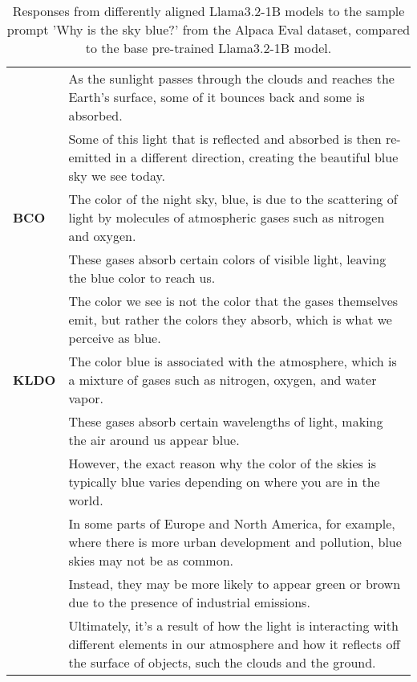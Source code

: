 \begin{table}[!ht]
{\begin{tabular}{ll}
        & \small As the sunlight passes through the clouds and reaches the Earth's surface, some of it bounces back and some is absorbed. \\
        & \small Some of this light that is reflected and absorbed is then re-emitted in a different direction, creating the beautiful blue sky we see today. \\
        \midrule 
        \textbf{BCO} & \small The color of the night sky, blue, is due to the scattering of light by molecules of atmospheric gases such as nitrogen and oxygen. \\
        & \small These gases absorb certain colors of visible light, leaving the blue color to reach us. \\
        & \small The color we see is not the color that the gases themselves emit, but rather the colors they absorb, which is what we perceive as blue. \\
        \midrule
        \textbf{KLDO} & \small The color blue is associated with the atmosphere, which is a mixture of gases such as nitrogen, oxygen, and water vapor. \\
        & \small These gases absorb certain wavelengths of light, making the air around us appear blue. \\
        & \small However, the exact reason why the color of the skies is typically blue varies depending on where you are in the world. \\
        & \small In some parts of Europe and North America, for example, where there is more urban development and pollution, blue skies may not be as common. \\
        & \small Instead, they may be more likely to appear green or brown due to the presence of industrial emissions. \\
        & \small Ultimately, it's a result of how the light is interacting with different elements in our atmosphere and how it reflects off the surface of objects, such the clouds and the ground.\\
        \bottomrule
    \end{tabular}
}
    \caption{Responses from differently aligned Llama3.2-1B models to the sample prompt 'Why is the sky blue?' from the Alpaca Eval dataset, compared to the base pre-trained Llama3.2-1B model.}
    \label{tab:sample_alpaca}
\end{table}

